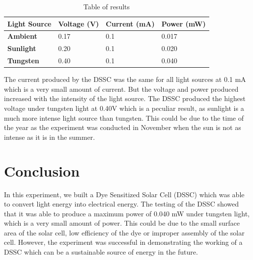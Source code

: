 \documentclass[a4paper, 12pt, english]{article}
\begin{document}
\begin{table}[H]
	\centering
	\caption{Table of results}
	\label{tab:results}
	\begin{tabular}{llll}
		\toprule
		\textbf{Light Source} & \textbf{Voltage (V)} & \textbf{Current (mA)} & \textbf{Power (mW)} \\
		\midrule
		\textbf{Ambient}      & 0.17                 & 0.1                   & 0.017               \\
		\textbf{Sunlight}     & 0.20                 & 0.1                   & 0.020               \\
		\textbf{Tungsten}     & 0.40                 & 0.1                   & 0.040               \\
		\bottomrule
	\end{tabular}
\end{table}

The current produced by the DSSC was the same for all light sources at 0.1 mA
which is a very small amount of current. But the voltage and power produced
increased with the intensity of the light source. The DSSC produced the highest
voltage under tungsten light at 0.40V which is a peculiar result, as sunlight
is a much more intense light source than tungsten. This could be due to the
time of the year as the experiment was conducted in November when the sun is
not as intense as it is in the summer.

\section{Conclusion}
In this experiment, we built a Dye Sensitized Solar Cell (DSSC) which was able
to convert light energy into electrical energy. The testing of the DSSC showed
that it was able to produce a maximum power of 0.040 mW under tungsten light,
which is a very small amount of power. This could be due to the small surface
area of the solar cell, low efficiency of the dye or improper assembly of the
solar cell. However, the experiment was successful in demonstrating the working
of a DSSC which can be a sustainable source of energy in the future.
\end{document}
